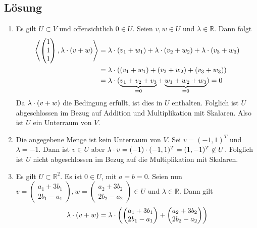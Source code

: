 \documentclass[german,12pt]{homework}
\newcommand{\RR}{\mathbb{R}}
\newcommand{\dotproduct}[2]{\left\langle#1, #2\right\rangle}
\DeclarePairedDelimiter{\enbrace}{(}{)}
\begin{document}
    \subsection*{Lösung}
    \begin{enumerate}
        \item Es gilt \(U \subset V\) und offensichtlich \(0 \in U\). Seien \(v, w \in U\) und \(\lambda \in \RR\). Dann folgt
        \begin{align*}
            \dotproduct{\begin{pmatrix}1\\1\\1\end{pmatrix}}{\lambda \cdot \enbrace*{v + w}} &= \lambda \cdot \enbrace*{v_1 + w_1} + \lambda \cdot \enbrace*{v_2 + w_2} + \lambda \cdot \enbrace*{v_3 + w_3}\\
            &= \lambda \cdot \enbrace*{\enbrace*{v_1 + w_1} + \enbrace*{v_2 + w_2} + \enbrace*{v_3 + w_3}}\\
            &= \lambda \cdot \enbrace{\underbrace{v_1 + v_2 + v_3}_{= 0} + \underbrace{w_1 + w_2 + w_3}_{= 0}} = 0
        \end{align*}
        Da \(\lambda \cdot \enbrace*{v + w}\) die Bedingung erfüllt, ist dies in \(U\) enthalten. Folglich ist \(U\) abgeschlossen im Bezug auf Addition und Multiplikation mit Skalaren. Also ist \(U\) ein Unterraum von \(V\).
        \[\]
        \item Die angegebene Menge ist kein Unterraum von \(V\). Sei \(v = (-1, 1)^T\) und \(\lambda = -1\). Dann ist \(v \in U\) aber \(\lambda \cdot v = \enbrace*{-1} \cdot (-1, 1)^T = (1, -1)^T \not\in U\). Folglich ist \(U\) nicht abgeschlossen im Bezug auf die Multiplikation mit Skalaren.
        \item Es gilt \(U \subset \RR^2\). Es ist \(0 \in U\), mit \(a = b = 0\). Seien nun \(v = \begin{pmatrix}a_1 + 3b_1\\2b_1 - a_1\end{pmatrix}, w = \begin{pmatrix}a_2 + 3b_2\\2b_2 - a_2\end{pmatrix} \in U\) und \(\lambda \in \RR\). Dann gilt
        \begin{align*}
            \lambda \cdot \enbrace*{v + w} &= \lambda \cdot \enbrace*{\begin{pmatrix}a_1 + 3b_1\\2b_1 - a_1\end{pmatrix} + \begin{pmatrix}a_2 + 3b_2\\2b_2 - a_2\end{pmatrix}}\\

\end{align*}
\end{enumerate}
\end{document}
